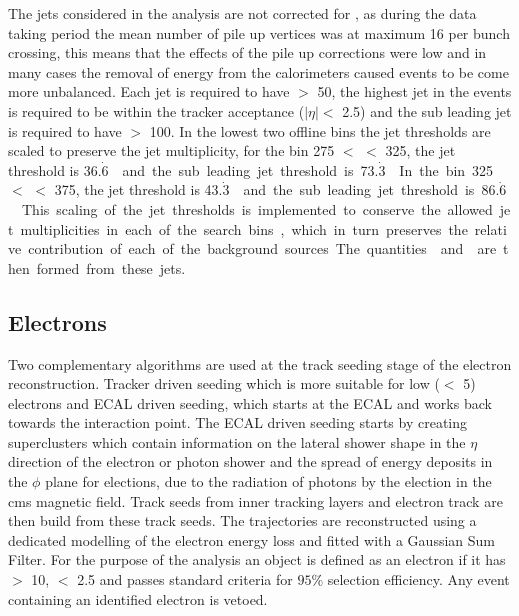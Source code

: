 The jets considered in the analysis are not corrected for \pu, as during the data taking period the mean number of pile up vertices was at maximum 16 per bunch crossing, this means that the effects of the pile up corrections were low and in many cases the removal of energy from the calorimeters caused events to be come more unbalanced. Each jet is required to have \ET $>$ \unit{50}{\GeV}, the highest \ET jet in the events is required to be within the tracker acceptance ($|\eta| <$ 2.5) and the sub leading jet is required to have \ET $>$ \unit{100}{\GeV}. In the lowest two offline \HT bins the jet thresholds are scaled to preserve the jet multiplicity, for the bin \unit{275}{\GeV} $<$ \HT $<$ \unit{325}{\GeV}, the jet threshold is \unit{36.$\dot{6}$}{\GeV} and the sub leading jet threshold is \unit{73.$\dot{3}$}{\GeV}. In the bin \unit{325}{\GeV} $<$ \HT $<$ \unit{375}{\GeV}, the jet threshold is \unit{43.$\dot{3}$}{\GeV} and the sub leading jet threshold is \unit{86.$\dot{6}$}{\GeV}. This scaling of the jet thresholds is implemented to conserve the allowed jet multiplicities in each of the search bins, which in turn preserves the relative contribution of each of the background sources.

The quantities \HT and \HTm are then formed from these jets.

\subsection{Electrons} %
\label{sub:electrons}
Two complementary algorithms are used at the track seeding stage of the 
electron reconstruction. Tracker driven seeding which is more suitable for low 
\PT (\PT $<$ \unit{5}{\GeV}) electrons and ECAL driven seeding, which starts at 
the ECAL and works back towards the interaction point. The ECAL driven seeding 
starts by creating superclusters which contain 
information on the lateral shower shape in the $\eta$ direction of the electron 
or photon shower and the spread of energy deposits in the $\phi$ plane for 
elections, due to the radiation of photons by the election in the \ac{cms} 
magnetic field. Track seeds from inner tracking layers and electron track are 
then build from these track seeds. The trajectories are reconstructed using a 
dedicated modelling of the electron energy loss and fitted with a Gaussian Sum 
Filter.
For the purpose of the analysis an object is defined as an electron if it has 
\PT $>$ \unit{10}{\GeV}, \mETA $<$ 2.5 and passes standard criteria for $95\%$ selection efficiency. Any event containing an identified 
electron is vetoed. 

